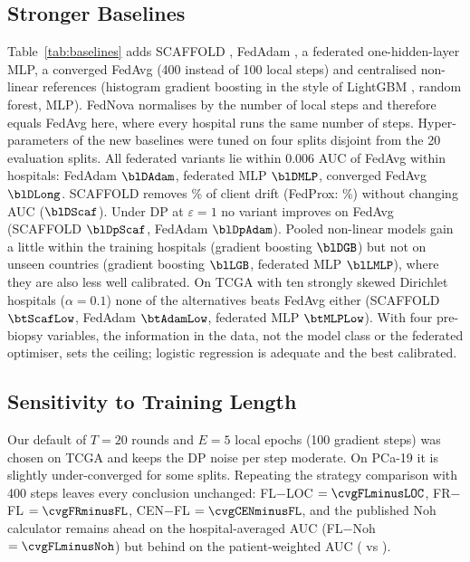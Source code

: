 \subsection{Stronger Baselines}
\label{sec:p19_baselines}
Table~\ref{tab:baselines} adds SCAFFOLD \cite{Karimireddy2020Scaffold}, FedAdam \cite{Reddi2021FedOpt}, a federated one-hidden-layer MLP, a converged FedAvg (400 instead of 100 local steps) and centralised non-linear references (histogram gradient boosting in the style of LightGBM \cite{Ke2017LightGBM}, random forest, MLP). FedNova \cite{Wang2020FedNova} normalises by the number of local steps and therefore equals FedAvg here, where every hospital runs the same number of steps. Hyper-parameters of the new baselines were tuned on four splits disjoint from the 20 evaluation splits. All federated variants lie within 0.006 AUC of FedAvg within hospitals: FedAdam $\blDAdam$, federated MLP $\blDMLP$, converged FedAvg $\blDLong$. SCAFFOLD removes \blScafDrift\% of client drift (FedProx: \blProxDrift\%) without changing AUC ($\blDScaf$). Under DP at $\varepsilon=1$ no variant improves on FedAvg (SCAFFOLD $\blDpScaf$, FedAdam $\blDpAdam$). Pooled non-linear models gain a little within the training hospitals (gradient boosting $\blDGB$) but not on unseen countries (gradient boosting $\blLGB$, federated MLP $\blLMLP$), where they are also less well calibrated. On TCGA with ten strongly skewed Dirichlet hospitals ($\alpha=0.1$) none of the alternatives beats FedAvg either (SCAFFOLD $\btScafLow$, FedAdam $\btAdamLow$, federated MLP $\btMLPLow$). With four pre-biopsy variables, the information in the data, not the model class or the federated optimiser, sets the ceiling; logistic regression is adequate and the best calibrated.



\subsection{Sensitivity to Training Length}
Our default of $T=20$ rounds and $E=5$ local epochs (100 gradient steps) was chosen on TCGA and keeps the DP noise per step moderate. On PCa-19 it is slightly under-converged for some splits. Repeating the strategy comparison with 400 steps leaves every conclusion unchanged: FL$-$LOC $=\cvgFLminusLOC$, FR$-$FL $=\cvgFRminusFL$, CEN$-$FL $=\cvgCENminusFL$, and the published Noh calculator remains ahead on the hospital-averaged AUC (FL$-$Noh $=\cvgFLminusNoh$) but behind on the patient-weighted AUC (\cvgWFL{} vs \cvgWNoh{}).

